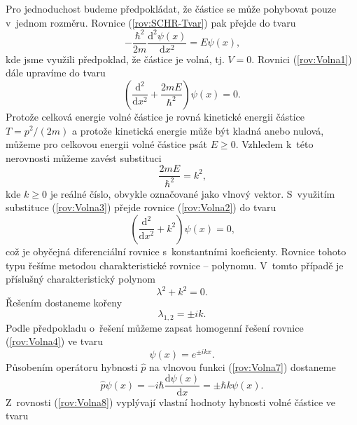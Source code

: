 Pro jednoduchost budeme předpokládat, že částice se může pohybovat pouze v~jednom rozměru. Rovnice (\ref{rov:SCHR-Tvar}) pak přejde do tvaru
\begin{equation}
-\frac{\hbar^2}{2m} \frac{\mathrm{d}^2\psi(x)}{\mathrm{d}x^2} = E \psi(x) \mbox{,}
\label{rov:Volna1}
\end{equation}
kde jsme využili předpoklad, že částice je volná, tj. $V = 0$. Rovnici (\ref{rov:Volna1}) dále upravíme do tvaru
\begin{equation}
\left( \frac{\mathrm{d}^2}{\mathrm{d}x^2} + \frac{2mE}{\hbar^2} \right) \psi(x) = 0 \mbox{.}
\label{rov:Volna2}
\end{equation}
Protože celková energie volné částice je rovná kinetické energii částice $T=p^2/(2m)$ a protože kinetická energie může být kladná anebo nulová, můžeme pro celkovou energii volné částice psát $E \geq 0$. Vzhledem k~této nerovnosti můžeme zavést substituci
\begin{equation}
\frac{2mE}{\hbar^2} = k^2 \mbox{,}
\label{rov:Volna3}
\end{equation}
kde $k\geq0$ je reálné číslo, obvykle označované jako vlnový vektor. S~využitím substituce (\ref{rov:Volna3}) přejde rovnice (\ref{rov:Volna2}) do tvaru
\begin{equation}
\left( \frac{\mathrm{d}^2}{\mathrm{d}x^2} + k^2 \right) \psi(x) = 0 \mbox{,}
\label{rov:Volna4}
\end{equation}
což je obyčejná diferenciální rovnice s~konstantními koeficienty. Rovnice tohoto typu řešíme metodou charakteristické rovnice -- polynomu. V~tomto případě je příslušný charakteristický polynom
\begin{equation}
\lambda^2 + k^2 = 0 \mbox{.}
\label{rov:Volna5}
\end{equation}
Řešením dostaneme kořeny
\begin{equation}
\lambda_{1,2} = \pm ik \mbox{.}
\label{rov:Volna6}
\end{equation}
Podle předpokladu o~řešení můžeme zapsat homogenní řešení rovnice (\ref{rov:Volna4}) ve tvaru
\begin{equation}
\psi(x) = e^{\pm ikx} \mbox{.}
\label{rov:Volna7}
\end{equation}
Působením operátoru hybnosti  $\hat{p}$ na vlnovou funkci (\ref{rov:Volna7}) dostaneme
\begin{equation}
\hat{p} \psi(x) = -i\hbar \frac{\mathrm{d}\psi(x)}{\mathrm{d}x} = \pm \hbar k \psi(x) \mbox{.}
\label{rov:Volna8}
\end{equation}
Z~rovnosti (\ref{rov:Volna8}) vyplývají vlastní hodnoty hybnosti volné částice ve tvaru
